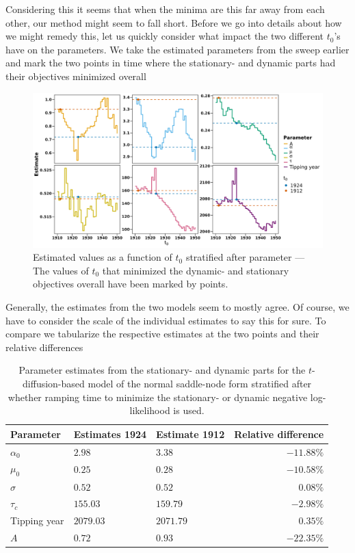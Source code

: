 Considering this it seems that when the minima are this far away from each other, our method might seem to fall short. Before we go into details about how we might remedy this, let us quickly consider what impact the two different $t_0$'s have on the parameters. We take the estimated parameters from the sweep earlier and mark the two points in time where the stationary- and dynamic parts had their objectives minimized overall
\begin{figure}[h!]
    \begin{center}
        \includegraphics[scale = .09]{figures/estimators_full_plot.jpeg}
        \caption{Estimated values as a function of $t_0$ stratified after parameter — The values of $t_0$ that minimized the dynamic- and stationary objectives overall have been marked by points.}
    \end{center}
    \label{figure:AMOC_estimates_t_0}
\end{figure}
\newpage
\noindent Generally, the estimates from the two models seem to mostly agree. Of course, we have to consider the scale of the individual estimates to say this for sure. To compare we tabularize the respective estimates at the two points and their relative differences
\begin{table}[h!]
    \centering
    \begin{tabular}{lllr}
     Parameter & Estimates 1924 & Estimate 1912 & Relative difference \\ \hline
    $\alpha_0$ & $2.98$ & 3$.38$ & $-11.88\%$ \\ 
      $\mu_0$ & $0.25$ & $0.28$ & $-10.58\%$ \\ 
      $\sigma$ & $0.52$ & $0.52$ & 0$.08\%$ \\ 
      $\tau_c$ & $155.03$ & $159.79$ & $-2.98\%$ \\ 
      Tipping year & $2079.03$ & $2071.79$ & $0.35\%$\\ 
      $A$ & $0.72$ & $0.93$ & $-22.35\%$ \\ 
       \hline
    \end{tabular}
    \caption{Parameter estimates from the stationary- and dynamic parts for the $t$-diffusion-based model of the normal saddle-node form stratified after whether ramping time to minimize the stationary- or dynamic negative log-likelihood is used.}
    \label{table:Estimates_t0_AMOC}
\end{table}\\

